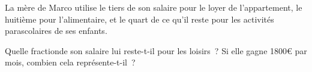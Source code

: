 %
%
La mère de Marco utilise le tiers de son salaire pour le loyer de l'appartement, le huitième pour l'alimentaire, et le quart de ce qu'il reste pour les activités parascolaires de ses enfants.
  \begin{tasks}
    \task Quelle fractionde son salaire lui reste-t-il pour les loisirs~?
    \task Si elle gagne 1800€ par mois, combien cela représente-t-il~?
  \end{tasks}
